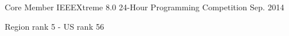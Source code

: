 

\begin{cventries}

  \cventry
    {Core Member} %
    {IEEEXtreme 8.0 24-Hour Programming Competition} %
    {} %
    {Sep. 2014} %
    {
      \begin{cvitems} %
        \item {Region rank 5 - US rank 56}
      \end{cvitems}
    }

\end{cventries}

